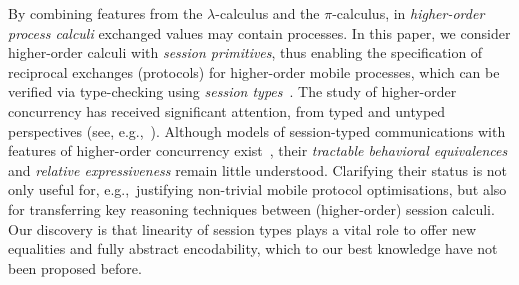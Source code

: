 \noi 
By combining features from the $\lambda$-calculus and the $\pi$-calculus, 
in \emph{higher-order process calculi} exchanged values may contain  processes. 
In this paper, we consider higher-order calculi with \emph{session primitives},
thus enabling the specification of reciprocal exchanges (protocols) 
for higher-order mobile processes, 
which can be verified via type-checking using \emph{session types}~\cite{honda.vasconcelos.kubo:language-primitives}.
The study of higher-order concurrency has received significant attention, 
from typed and untyped perspectives (see, e.g.,~\cite{ThomsenB:plachoasgcfhop,SangiorgiD:expmpa,San96int,JeffreyR05,mostrous_phd,DBLP:journals/iandc/LanesePSS11,DBLP:conf/icalp/LanesePSS10,DBLP:conf/esop/KoutavasH11,XuActa2012}).
Although models of session-typed 
communications with features of higher-order concurrency exist~\cite{tlca07,DBLP:journals/jfp/GayV10},
their  \emph{tractable behavioral equivalences} and \emph{relative expressiveness}
remain little understood. 
Clarifying their status is not only useful for, 
e.g.,~justifying non-trivial mobile protocol
optimisations, but also for transferring key reasoning techniques
between (higher-order) session calculi. Our discovery 
is that linearity of session types plays a vital role to 
offer new equalities and fully abstract encodability, 
which to our best knowledge have not been proposed before.   

